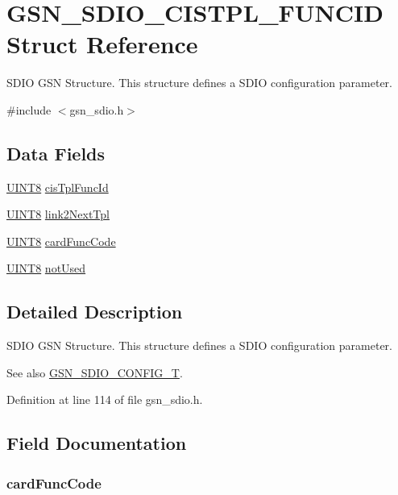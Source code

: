 \hypertarget{a00221}{
\section{GSN\_\-SDIO\_\-CISTPL\_\-FUNCID Struct Reference}
\label{a00221}
}


SDIO GSN Structure. This structure defines a SDIO configuration parameter.  




{\ttfamily \#include $<$gsn\_\-sdio.h$>$}

\subsection*{Data Fields}
\begin{DoxyCompactItemize}
\item 
\hyperlink{a00660_gab27e9918b538ce9d8ca692479b375b6a}{UINT8} \hyperlink{a00221_ae897ef59d4aba6192fbb03c505363471}{cisTplFuncId}
\item 
\hyperlink{a00660_gab27e9918b538ce9d8ca692479b375b6a}{UINT8} \hyperlink{a00221_adb5f177f5de86565991790a9c2c079b5}{link2NextTpl}
\item 
\hyperlink{a00660_gab27e9918b538ce9d8ca692479b375b6a}{UINT8} \hyperlink{a00221_ad30f4e3dca0b31527119dcb3d076d6f6}{cardFuncCode}
\item 
\hyperlink{a00660_gab27e9918b538ce9d8ca692479b375b6a}{UINT8} \hyperlink{a00221_a0bbae02777b7e690c5c1e080c39a55df}{notUsed}
\end{DoxyCompactItemize}


\subsection{Detailed Description}
SDIO GSN Structure. This structure defines a SDIO configuration parameter. 

\begin{DoxySeeAlso}{See also}
\hyperlink{a00653_ga741fda4dc2cd93143a8a73ddaace7de8}{GSN\_\-SDIO\_\-CONFIG\_\-T}. 
\end{DoxySeeAlso}


Definition at line 114 of file gsn\_\-sdio.h.



\subsection{Field Documentation}
\hypertarget{a00221_ad30f4e3dca0b31527119dcb3d076d6f6}{
\subsubsection[{cardFuncCode}]{ {\bf cardFuncCode}}}
\label{a00221_ad30f4e3dca0b31527119dcb3d076d6f6}


